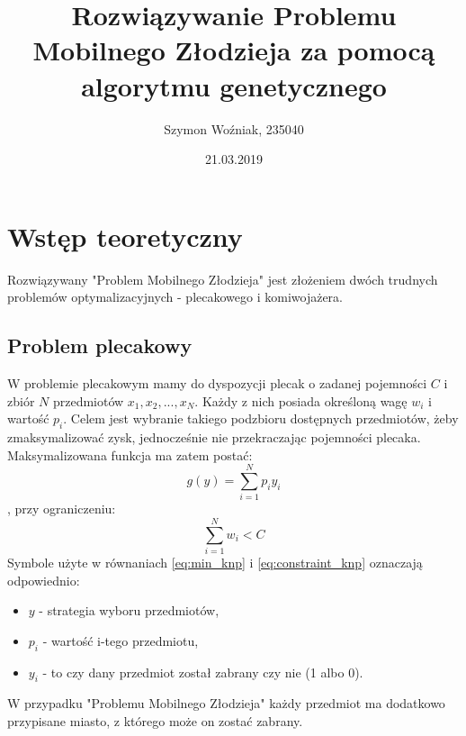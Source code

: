 \documentclass{article}
\author{Szymon Woźniak, 235040}
\date{21.03.2019}
\title{Rozwiązywanie Problemu Mobilnego Złodzieja za pomocą algorytmu genetycznego}
\begin{document}
	\maketitle
	\newpage
	
	\section{Wstęp teoretyczny}
	Rozwiązywany "Problem Mobilnego Złodzieja" jest złożeniem dwóch trudnych problemów optymalizacyjnych - plecakowego i komiwojażera.
	\subsection{Problem plecakowy}
	W problemie plecakowym mamy do dyspozycji plecak o zadanej pojemności $C$ i zbiór $N$ przedmiotów ${x_{1}, x_{2}, ..., x_{N}}$. Każdy z nich posiada określoną wagę $w_{i}$ i wartość $p_{i}$. Celem jest wybranie takiego podzbioru dostępnych przedmiotów, żeby zmaksymalizować zysk, jednocześnie nie przekraczając pojemności plecaka. Maksymalizowana funkcja ma zatem postać:
	\begin{equation}\label{eq:min_knp}
		g(y) = \sum\limits_{i=1}^{N} p_{i}y_{i}
	\end{equation}
	, przy ograniczeniu:
	\begin{equation}\label{eq:constraint_knp}
		\sum\limits_{i=1}^{N} w_{i} < C
	\end{equation}
	Symbole użyte w równaniach \ref{eq:min_knp} i \ref{eq:constraint_knp} oznaczają odpowiednio:
	\begin{itemize}
		\item $y$ - strategia wyboru przedmiotów,
		\item $p_{i}$ - wartość i-tego przedmiotu,
		\item $y_{i}$ - to czy dany przedmiot został zabrany czy nie (1 albo 0).
	\end{itemize}
	W przypadku "Problemu Mobilnego Złodzieja" każdy przedmiot ma dodatkowo przypisane miasto, z którego może on zostać zabrany.
\end{document}
